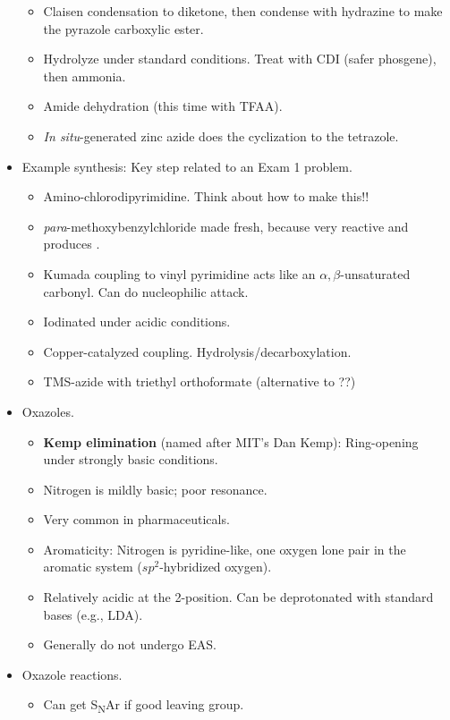 \documentclass[../notes.tex]{subfiles}
\begin{document}
\begin{itemize}
\begin{itemize}
        \item Claisen condensation to diketone, then condense with hydrazine to make the pyrazole carboxylic ester.
        \item Hydrolyze under standard conditions. Treat with CDI (safer phosgene), then ammonia.
        \item Amide dehydration (this time with TFAA).
        \item \emph{In situ}-generated zinc azide does the cyclization to the tetrazole.
    \end{itemize}
    \item Example synthesis: Key step related to an Exam 1 problem.
    \begin{itemize}
        \item Amino-chlorodipyrimidine. Think about how to make this!!
        \item \emph{para}-methoxybenzylchloride made fresh, because very reactive and produces .
        \item Kumada coupling to vinyl pyrimidine acts like an $\alpha,\beta$-unsaturated carbonyl. Can do nucleophilic attack.
        \item Iodinated under acidic conditions.
        \item Copper-catalyzed  coupling. Hydrolysis/decarboxylation.
        \item TMS-azide with triethyl orthoformate (alternative to ??)
    \end{itemize}
    \item Oxazoles.
    \begin{itemize}
        \item \textbf{Kemp elimination} (named after MIT's Dan Kemp): Ring-opening under strongly basic conditions.
        \item Nitrogen is mildly basic; poor resonance.
        \item Very common in pharmaceuticals.
        \item Aromaticity: Nitrogen is pyridine-like, one oxygen lone pair in the aromatic system ($sp^2$-hybridized oxygen).
        \item Relatively acidic at the 2-position. Can be deprotonated with standard bases (e.g., LDA).
        \item Generally do not undergo EAS.
    \end{itemize}
    \item Oxazole reactions.
    \begin{itemize}
        \item Can get S\textsubscript{N}Ar if good leaving group.

\end{itemize}
\end{itemize}
\end{document}
